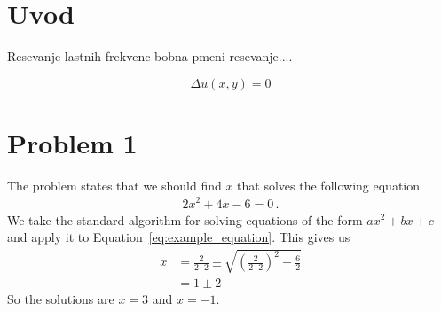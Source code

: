 \section{Uvod}

Resevanje lastnih frekvenc bobna pmeni resevanje....

\begin{equation}
    \label{eq:laplace}
    \Delta u(x, y) = 0
\end{equation}

\section{Problem 1}
The problem states that we should find $x$ that solves the following equation
\begin{align}
    \label{eq:example_equation} %
    2 x^2 + 4 x - 6 = 0 \,.
\end{align}
We take the standard algorithm for solving equations of the form $a x^2 + bx + c$ and apply it to Equation~\ref{eq:example_equation}. This gives us
\begin{align}
    x 
    &= \frac{2}{2 \cdot 2} \pm \sqrt{\left( \frac{2}{2 \cdot 2} \right)^2 + \frac{6}{2} } \\
    &= 1 \pm 2
\end{align}
So the solutions are $x=3$ and $x = -1$.

